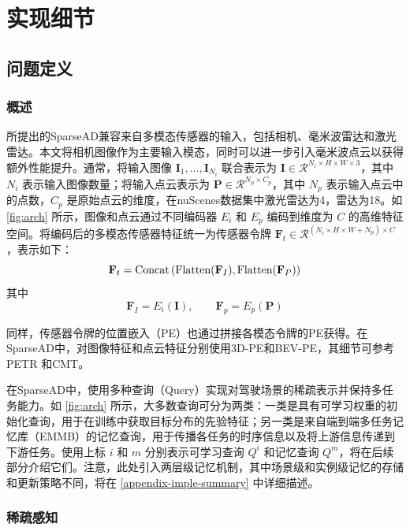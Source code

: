 \section{实现细节}
\label{appendix-imple}
\subsection{问题定义}
\label{appendix-imple-def}

\subsubsection{概述}
\label{appendix-imple-def-overview}

所提出的SparseAD兼容来自多模态传感器的输入，包括相机、毫米波雷达和激光雷达。本文将相机图像作为主要输入模态，同时可以进一步引入毫米波点云以获得额外性能提升。通常，将输入图像 $\textbf{I}_1,... ,\textbf{I}_{N_i}$ 联合表示为 $\textbf{I} \in \mathcal{R}^{N_i \times H \times W \times 3}$，其中 $N_i$ 表示输入图像数量；将输入点云表示为 $\mathbf{P} \in \mathcal{R}^{N_p \times {C_p}}$，其中 $N_p$ 表示输入点云中的点数，$C_p$ 是原始点云的维度，在nuScenes数据集中激光雷达为4，雷达为18。如 \cref{fig:arch} 所示，图像和点云通过不同编码器 $E_i$ 和 $E_p$ 编码到维度为 $C$ 的高维特征空间。将编码后的多模态传感器特征统一为传感器令牌 $\textbf{F}_t \in \mathcal{R}^{(N_i \times H \times W + N_p) \times C}$，表示如下：
\begin{equation}
{{\mathbf{F}}_t} = {\rm{Concat}}\left( {{\rm{Flatten(}}{{\mathbf{F}}_I}{\rm{),Flatten(}}{{\mathbf{F}}_P}{\rm{)}}} \right)
\end{equation}
其中
$$
\mathbf{F}_I = E_i(\mathbf{I}),\qquad\mathbf{F}_p = E_p(\mathbf{P})
$$

同样，传感器令牌的位置嵌入（PE）也通过拼接各模态令牌的PE获得。在SparseAD中，对图像特征和点云特征分别使用3D-PE和BEV-PE，其细节可参考PETR\cite{liu2022petr} 和CMT\cite{yan2023cross}。

在SparseAD中，使用多种查询（Query）实现对驾驶场景的稀疏表示并保持多任务能力。如 \cref{fig:arch} 所示，大多数查询可分为两类：一类是具有可学习权重的初始化查询，用于在训练中获取目标分布的先验特征；另一类是来自端到端多任务记忆库（EMMB）的记忆查询，用于传播各任务的时序信息以及将上游信息传递到下游任务。使用上标 $i$ 和 $m$ 分别表示可学习查询 $Q^i$ 和记忆查询 $Q^m$，将在后续部分介绍它们。注意，此处引入两层级记忆机制，其中场景级和实例级记忆的存储和更新策略不同，将在 \cref{appendix-imple-summary} 中详细描述。

\subsubsection{稀疏感知}
\label{appendix-imple-def-perception}

